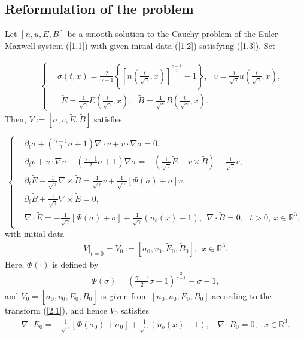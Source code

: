 \documentclass[11pt]{amsart}
\numberwithin{equation}{section}
\begin{document}
\vspace{4mm}
\subsection{Reformulation of the problem} Let $[n,u,E,B]$ be a smooth
solution to the Cauchy problem of the Euler-Maxwell system
(\ref{1.1}) with given initial data (\ref{1.2}) satisfying
(\ref{1.3}). Set

\begin{eqnarray}\label{2.1}
&&\left\{
  \begin{aligned}
   &\sigma(t,x)=\frac{2}{\gamma-1}\left\{\left[n\left(\frac{t}{\sqrt{\gamma}},x\right)\right]
   ^{\frac{\gamma-1}{2}}-1\right\}, \ \ \
   v=\frac{1}{\sqrt{\gamma}}u\left(\frac{t}{\sqrt{\gamma}},x\right),
   \\[5mm]
   &\ \
   \tilde{E}=\frac{1}{\sqrt{\gamma}}E\left(\frac{t}{\sqrt{\gamma}},x\right),\ \
   \ \tilde{B}=\frac{1}{\sqrt{\gamma}}B\left(\frac{t}{\sqrt{\gamma}},x\right).
  \end{aligned}\right.
\end{eqnarray}
Then, $V:=[\sigma,v,\tilde{E},\tilde{B}]$ satisfies

\begin{equation}\label{2.2}
\left\{
  \begin{aligned}
  &\partial_t \sigma+\left(\frac{\gamma-1}{2}\sigma+1\right)\nabla\cdot v+v\cdot \nabla \sigma=0,\\
  &\partial_t v+v \cdot \nabla
  v+\left(\frac{\gamma-1}{2}\sigma+1\right)\nabla \sigma=-\left(\frac{1}{\sqrt{\gamma}}\tilde{E}+v\times \tilde{B}\right)
  -\frac{1}{\sqrt{\gamma}}v,\\
  &\partial_t\tilde{E}-\frac{1}{\sqrt{\gamma}}\nabla\times\tilde{B}
  =\frac{1}{\sqrt{\gamma}}v+\frac{1}{\sqrt{\gamma}}[\Phi(\sigma)+\sigma]v,\\
  &\partial_t \tilde{B}+\frac{1}{\sqrt{\gamma}}\nabla \times \tilde{E}=0,\\
 &\nabla \cdot
  \tilde{E}=-\frac{1}{\sqrt{\gamma}}[\Phi(\sigma)+\sigma]
  +\frac{1}{\sqrt{\gamma}}(n_{b}(x)-1), \ \ \nabla
  \cdot \tilde{B}=0, \ \ \ t>0,\ x\in\mathbb{R}^{3},
\end{aligned}\right.
\end{equation}
with initial data
\begin{eqnarray}\label{2.3}
V|_{t=0}=V_{0}:=[\sigma_{0},v_{0},\tilde{E}_{0},\tilde{B}_{0}],\ \
x\in\mathbb{R}^{3}.
\end{eqnarray}
Here, $\Phi(\cdot)$  is defined by
\begin{eqnarray}\label{def.phi}
\Phi(\sigma)=\left(\frac{\gamma-1}{2}\sigma+1\right)^{\frac{2}{\gamma-1}}-\sigma-1,
\end{eqnarray}
and $V_{0}=[\sigma_{0},v_{0},\tilde{E}_{0},\tilde{B}_{0}]$ is given
from $[n_{0},u_{0},E_{0},B_0]$ according to the transform
(\ref{2.1}), and hence $V_{0}$ satisfies
\begin{eqnarray}\label{2.4}
   \nabla\cdot\tilde{E}_0=-\frac{1}{\sqrt{\gamma}}[\Phi(\sigma_{0})+\sigma_{0}]
   +\frac{1}{\sqrt{\gamma}}(n_{b}(x)-1),\ \ \ \
   \nabla \cdot \tilde{B}_0=0,\ \ \ x\in\mathbb{R}^{3}.
\end{eqnarray}
\end{document}

